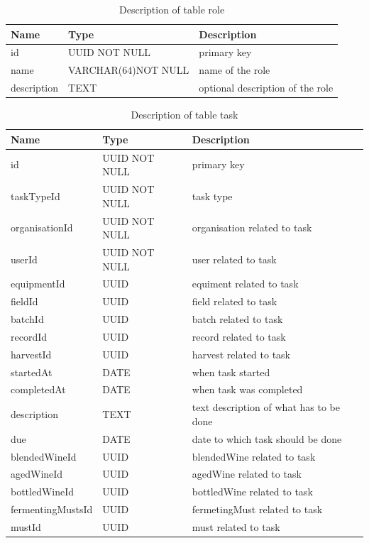 \begin{table}[th]
	\centering
	\caption{Description of table role}
	\begin{tabular}{|m{}|m{}|m{}|}
		\hline
		Name & Type & Description  \\
		\hline
		id & UUID NOT NULL & primary key \\
		\hline
		name & VARCHAR(64)\newline NOT NULL & name of the role \\
		\hline
		description & TEXT & optional description of the role \\
		\hline
	\end{tabular}
\end{table}
\begin{table}[th]
	\centering
	\caption{Description of table task}
	\begin{tabular}{|m{}|m{}|m{}|}
		\hline
		Name & Type & Description  \\
		\hline
		id & UUID NOT NULL & primary key \\
		\hline
		taskTypeId & UUID NOT NULL & task type \\
		\hline
		organisationId & UUID NOT NULL & organisation related to task \\
		\hline
		userId & UUID NOT NULL & user related to task \\
		\hline
		equipmentId & UUID & equiment related to task \\
		\hline
		fieldId & UUID & field related to task \\
		\hline
		batchId & UUID & batch related to task \\
		\hline
		recordId & UUID & record related to task \\
		\hline
		harvestId & UUID & harvest related to task \\
		\hline
		startedAt & DATE & when task started \\
		\hline
		completedAt & DATE & when task was completed \\
		\hline
		description & TEXT & text description of what has to be done \\
		\hline
		due & DATE & date to which task should be done \\
		\hline
		blendedWineId & UUID & blendedWine related to task \\
		\hline
		agedWineId & UUID & agedWine related to task \\
		\hline
		bottledWineId & UUID & bottledWine related to task \\
		\hline
		fermentingMustsId & UUID & fermetingMust related to task \\
		\hline
		mustId & UUID & must related to task \\
		\hline
	\end{tabular}
\end{table}
